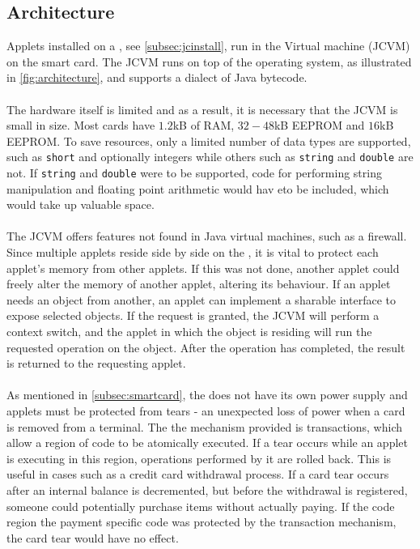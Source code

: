 \subsection{\jc Architecture}
Applets installed on a \jc, see \cref{subsec:jcinstall}, run in the \jc Virtual machine (JCVM) on the smart card. The JCVM runs on top of the operating system, as illustrated in \cref{fig:architecture},
and supports a dialect of Java bytecode.\\\\
The hardware itself is limited and as a result, it is necessary that the JCVM is small in size. Most cards have $1.2$kB of RAM, $32-48$kB EEPROM and $16$kB EEPROM\cite[Sec. 2.1]{java_card_spec}. To save resources, only a limited number of data types are supported, such as \texttt{short} and optionally integers while others such as \texttt{string} and \texttt{double} are not. If \texttt{string} and \texttt{double} were to be supported, code for performing string manipulation and floating point arithmetic would hav eto be included, which would take up valuable space.\\\\
The JCVM offers features not found in Java virtual machines, such as a firewall. Since multiple applets reside side by side on the \jc, it is vital to protect each applet's memory from other applets. If this was not done, another applet could freely alter the memory of another applet, altering its behaviour. If an applet needs an object from another, an applet can implement a sharable interface to expose selected objects. If the request is granted, the JCVM will perform a context switch, and the applet in which the object is residing will run the requested operation on the object. After the operation has completed, the result is returned to the requesting applet.\\\\
As mentioned in \cref{subsec:smartcard}, the \jc does not have its own power supply and applets must be protected from tears - an unexpected loss of power when a card is removed from a terminal. The the mechanism provided is transactions, which allow a region of code to be atomically executed. If a tear occurs while an applet is executing in this region, operations performed by it are rolled back. This is useful in cases such as a credit card withdrawal process. If a card tear occurs after an internal balance is decremented, but before the withdrawal is registered, someone could potentially purchase items without actually paying. If the code region the payment specific code was protected by the transaction mechanism, the card tear would have no effect.\\\\

